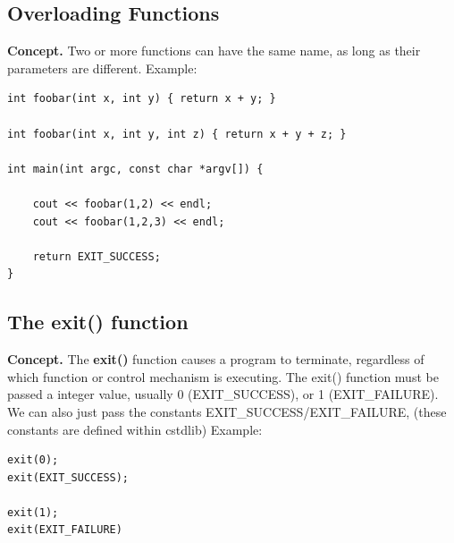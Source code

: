 \documentclass{report}
\begin{document}
    \bigbreak \noindent 
    \bigbreak \noindent 

    \pagebreak \bigbreak \noindent 
    \subsection{Overloading Functions}
    \bigbreak \noindent 
    \textbf{Concept.} Two or more functions can have the same name, as long as their parameters are different.
    \bigbreak \noindent 
    Example:
    \bigbreak \noindent 
    \sepline
    \begin{verbatim}
int foobar(int x, int y) { return x + y; }

int foobar(int x, int y, int z) { return x + y + z; }

int main(int argc, const char *argv[]) {

    cout << foobar(1,2) << endl;
    cout << foobar(1,2,3) << endl;

    return EXIT_SUCCESS;
}
    \end{verbatim}
    \sepline

    \bigbreak \noindent \bigbreak \noindent 
    \subsection{The exit() function}
    \bigbreak \noindent 
    \textbf{Concept.}
    \bigbreak \noindent 
    The \textbf{exit()} function causes a program to terminate, regardless of which function or control mechanism is executing.
    \bigbreak \noindent 
    \bigbreak \noindent 
    The exit() function must be passed a integer value, usually 0 (EXIT\_SUCCESS), or 1 (EXIT\_FAILURE). We can also just pass the constants EXIT\_SUCCESS/EXIT\_FAILURE, (these constants are defined within cstdlib)
    Example:
    \bigbreak \noindent 
    \sepline
    \begin{verbatim}
exit(0);
exit(EXIT_SUCCESS);

exit(1);
exit(EXIT_FAILURE)
    \end{verbatim}
    \sepline

    \pagebreak \bigbreak \noindent 
\end{document}
